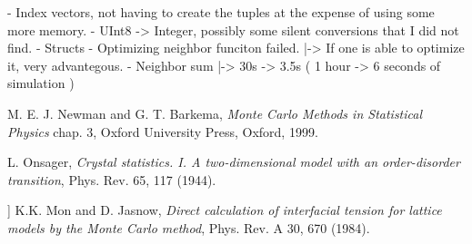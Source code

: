 \documentclass{article}
\begin{document}
- Index vectors, not having to create the tuples at the expense of using some more memory.
- UInt8 -> Integer, possibly some silent conversions that I did not find.
- Structs
- Optimizing neighbor funciton failed.
  |-> If one is able to optimize it, very advantegous.
- Neighbor sum
  |-> 30s -> 3.5s ( 1 hour -> 6 seconds of simulation )


\begin{thebibliography}{9}
 M. E. J. Newman and G. T. Barkema, \emph{Monte Carlo Methods in Statistical Physics} chap. 3, Oxford University Press, Oxford, 1999.

  L. Onsager, \emph{Crystal statistics. I. A two-dimensional model with an order-disorder transition},  Phys. Rev. 65, 117 (1944).

 ]  K.K. Mon and D. Jasnow, \emph{Direct calculation of interfacial tension for lattice models by the Monte Carlo method}, Phys. Rev. A 30, 670 (1984). 
\end{thebibliography}
\end{document}

